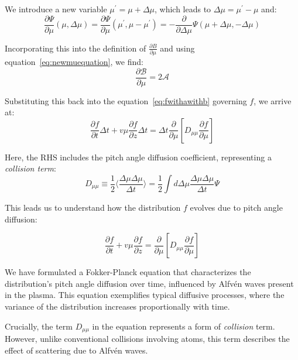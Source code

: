 We introduce a new variable \( \mu^\prime = \mu+\Delta\mu \), which leads to \( \Delta\mu = \mu^\prime -\mu \) and:
%
\begin{equation}\label{eq:newmuequation}
\frac{\partial\Psi}{\partial\mu}(\mu,\Delta\mu) = \frac{\partial\Psi}{\partial\mu}(\mu^\prime, \mu - \mu^\prime) = -\frac{\partial}{\partial \Delta\mu} \Psi(\mu+\Delta\mu, -\Delta\mu)
\end{equation}

Incorporating this into the definition of $\frac{\partial B}{\partial \mu}$ and using equation~\ref{eq:newmuequation}, we find:
%
\begin{equation}
\frac{\partial \mathcal B}{\partial \mu} = 2 \mathcal A
\end{equation}

Substituting this back into the equation~\ref{eq:fwithawithb} governing \( f \), we arrive at:
%
\begin{equation}
\frac{\partial f}{\partial t} \Delta t  +  v \mu \frac{\partial f}{\partial z} \Delta t = 
\Delta t \frac{\partial}{\partial\mu} \left[D_{\mu\mu}\frac{\partial f}{\partial\mu}\right]
\end{equation}

Here, the RHS includes the pitch angle diffusion coefficient, representing a \emph{collision term}:
%
\begin{equation}
D_{\mu\mu} \equiv \frac{1}{2}\langle \frac{\Delta\mu\Delta\mu}{\Delta t}\rangle = \frac{1}{2} \int d \Delta\mu \frac{\Delta\mu\Delta\mu}{\Delta t} \Psi
\end{equation}

This leads us to understand how the distribution \( f \) evolves due to pitch angle diffusion:
%
\begin{remark}
\begin{equation}\label{eq:fdiffmu}
\frac{\partial f}{\partial t} +v\mu \frac{\partial f}{\partial z} = \frac{\partial}{\partial\mu}\left[D_{\mu\mu}\frac{\partial f}{\partial\mu}  \right]
\end{equation}
\end{remark}

We have formulated a Fokker-Planck equation that characterizes the distribution's pitch angle diffusion over time, influenced by Alfvén waves present in the plasma. This equation exemplifies typical diffusive processes, where the variance of the distribution increases proportionally with time.

Crucially, the term \( D_{\mu\mu} \) in the equation represents a form of \emph{collision} term. However, unlike conventional collisions involving atoms, this term describes the effect of scattering due to Alfvén waves. 

